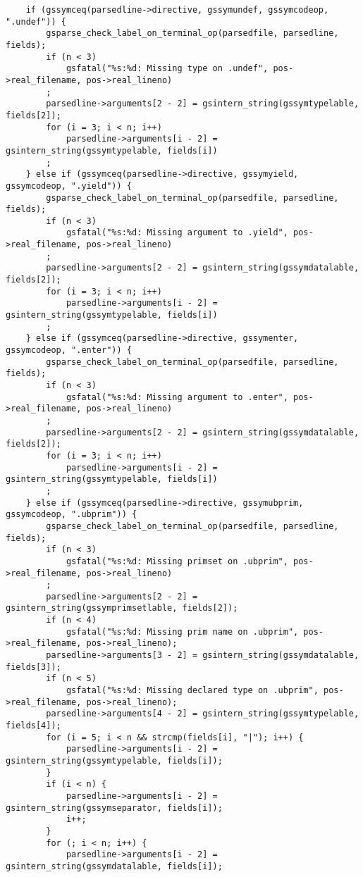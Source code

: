 \documentclass{report}
\begin{document}
\begin{verbatim}
    if (gssymceq(parsedline->directive, gssymundef, gssymcodeop, ".undef")) {
        gsparse_check_label_on_terminal_op(parsedfile, parsedline, fields);
        if (n < 3)
            gsfatal("%s:%d: Missing type on .undef", pos->real_filename, pos->real_lineno)
        ;
        parsedline->arguments[2 - 2] = gsintern_string(gssymtypelable, fields[2]);
        for (i = 3; i < n; i++)
            parsedline->arguments[i - 2] = gsintern_string(gssymtypelable, fields[i])
        ;
    } else if (gssymceq(parsedline->directive, gssymyield, gssymcodeop, ".yield")) {
        gsparse_check_label_on_terminal_op(parsedfile, parsedline, fields);
        if (n < 3)
            gsfatal("%s:%d: Missing argument to .yield", pos->real_filename, pos->real_lineno)
        ;
        parsedline->arguments[2 - 2] = gsintern_string(gssymdatalable, fields[2]);
        for (i = 3; i < n; i++)
            parsedline->arguments[i - 2] = gsintern_string(gssymtypelable, fields[i])
        ;
    } else if (gssymceq(parsedline->directive, gssymenter, gssymcodeop, ".enter")) {
        gsparse_check_label_on_terminal_op(parsedfile, parsedline, fields);
        if (n < 3)
            gsfatal("%s:%d: Missing argument to .enter", pos->real_filename, pos->real_lineno)
        ;
        parsedline->arguments[2 - 2] = gsintern_string(gssymdatalable, fields[2]);
        for (i = 3; i < n; i++)
            parsedline->arguments[i - 2] = gsintern_string(gssymtypelable, fields[i])
        ;
    } else if (gssymceq(parsedline->directive, gssymubprim, gssymcodeop, ".ubprim")) {
        gsparse_check_label_on_terminal_op(parsedfile, parsedline, fields);
        if (n < 3)
            gsfatal("%s:%d: Missing primset on .ubprim", pos->real_filename, pos->real_lineno)
        ;
        parsedline->arguments[2 - 2] = gsintern_string(gssymprimsetlable, fields[2]);
        if (n < 4)
            gsfatal("%s:%d: Missing prim name on .ubprim", pos->real_filename, pos->real_lineno);
        parsedline->arguments[3 - 2] = gsintern_string(gssymdatalable, fields[3]);
        if (n < 5)
            gsfatal("%s:%d: Missing declared type on .ubprim", pos->real_filename, pos->real_lineno);
        parsedline->arguments[4 - 2] = gsintern_string(gssymtypelable, fields[4]);
        for (i = 5; i < n && strcmp(fields[i], "|"); i++) {
            parsedline->arguments[i - 2] = gsintern_string(gssymtypelable, fields[i]);
        }
        if (i < n) {
            parsedline->arguments[i - 2] = gsintern_string(gssymseparator, fields[i]);
            i++;
        }
        for (; i < n; i++) {
            parsedline->arguments[i - 2] = gsintern_string(gssymdatalable, fields[i]);

\end{verbatim}
\end{document}
